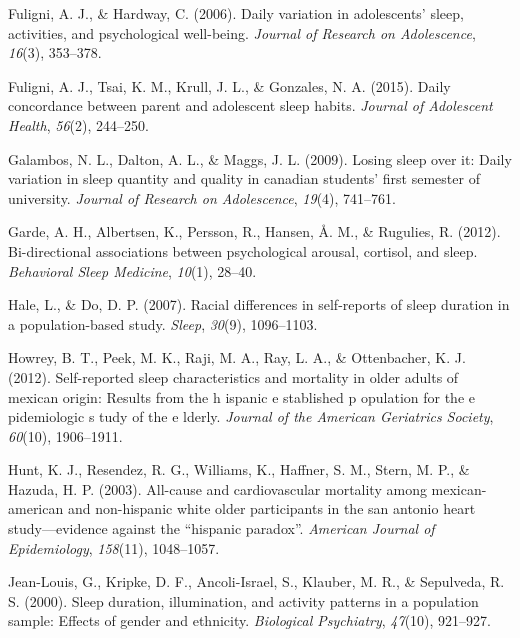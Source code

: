 \documentclass[man, fleqn, noextraspace]{apa6}
\begin{document}
\leavevmode\hypertarget{ref-fuligni2006daily}{}%
Fuligni, A. J., \& Hardway, C. (2006). Daily variation in adolescents' sleep, activities, and psychological well-being. \emph{Journal of Research on Adolescence}, \emph{16}(3), 353--378.

\leavevmode\hypertarget{ref-fuligni2015daily}{}%
Fuligni, A. J., Tsai, K. M., Krull, J. L., \& Gonzales, N. A. (2015). Daily concordance between parent and adolescent sleep habits. \emph{Journal of Adolescent Health}, \emph{56}(2), 244--250.

\leavevmode\hypertarget{ref-galambos2009losing}{}%
Galambos, N. L., Dalton, A. L., \& Maggs, J. L. (2009). Losing sleep over it: Daily variation in sleep quantity and quality in canadian students' first semester of university. \emph{Journal of Research on Adolescence}, \emph{19}(4), 741--761.

\leavevmode\hypertarget{ref-garde_2012_bi}{}%
Garde, A. H., Albertsen, K., Persson, R., Hansen, Å. M., \& Rugulies, R. (2012). Bi-directional associations between psychological arousal, cortisol, and sleep. \emph{Behavioral Sleep Medicine}, \emph{10}(1), 28--40.

\leavevmode\hypertarget{ref-hale2007racial}{}%
Hale, L., \& Do, D. P. (2007). Racial differences in self-reports of sleep duration in a population-based study. \emph{Sleep}, \emph{30}(9), 1096--1103.

\leavevmode\hypertarget{ref-howrey2012self}{}%
Howrey, B. T., Peek, M. K., Raji, M. A., Ray, L. A., \& Ottenbacher, K. J. (2012). Self-reported sleep characteristics and mortality in older adults of mexican origin: Results from the h ispanic e stablished p opulation for the e pidemiologic s tudy of the e lderly. \emph{Journal of the American Geriatrics Society}, \emph{60}(10), 1906--1911.

\leavevmode\hypertarget{ref-hunt2003all}{}%
Hunt, K. J., Resendez, R. G., Williams, K., Haffner, S. M., Stern, M. P., \& Hazuda, H. P. (2003). All-cause and cardiovascular mortality among mexican-american and non-hispanic white older participants in the san antonio heart study---evidence against the ``hispanic paradox''. \emph{American Journal of Epidemiology}, \emph{158}(11), 1048--1057.

\leavevmode\hypertarget{ref-jean2000sleep}{}%
Jean-Louis, G., Kripke, D. F., Ancoli-Israel, S., Klauber, M. R., \& Sepulveda, R. S. (2000). Sleep duration, illumination, and activity patterns in a population sample: Effects of gender and ethnicity. \emph{Biological Psychiatry}, \emph{47}(10), 921--927.
\end{document}

